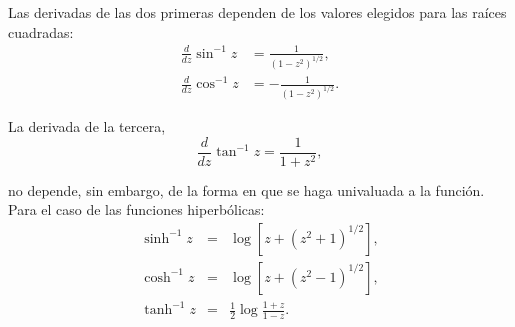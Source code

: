 Las derivadas de las dos primeras dependen de los valores elegidos para las raíces cuadradas:
\begin{align*}
\frac{d}{dz} \sin^{-1} z &= \frac{1}{(1-z^2)^{1/2}}, \\
\frac{d}{dz} \cos^{-1} z &= -\frac{1}{(1-z^2)^{1/2}}.
\end{align*}

La derivada de la tercera,
$$\frac{d}{dz} \tan^{-1} z = \frac{1}{1+z^2},$$

no depende, sin embargo, de la forma en que se haga univaluada a la función.
\\

Para el caso de las funciones hiperbólicas:
$$\boxed{\begin{array}{rll}
\sinh^{-1} z &=& \log [z + (z^2+1)^{1/2}], \\
\cosh^{-1} z &=& \log [z + (z^2-1)^{1/2}], \\
\tanh^{-1} z &=& \frac{1}{2} \log \frac{1+z}{1-z}.
\end{array}} $$